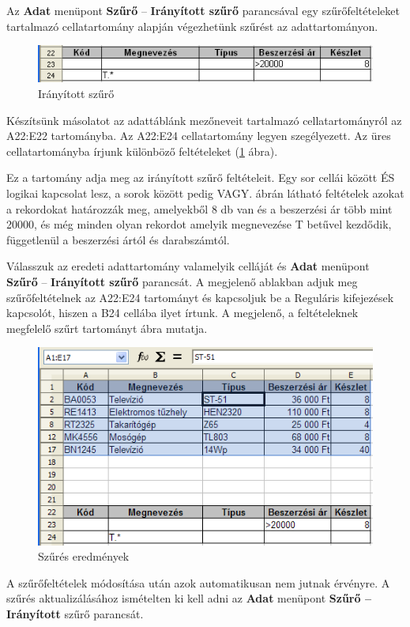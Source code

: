 Az \textbf{Adat} menüpont \textbf{Szűrő} --
\textbf{Irányított szűrő} parancsával egy
szűrőfeltételeket tartalmazó cellatartomány alapján
végezhetünk szűrést az adattartományon.

\begin{figure}[!h]
\begin{center}
\includegraphics[width=12.282cm]{oocalcv1-img118.png}
\caption{Irányított szűrő}\label{IrányítottSzűrő}
\end{center}
\end{figure}

Készítsünk másolatot az adattáblánk mezőneveit
tartalmazó cellatartományról az A22:E22 tartományba. Az A22:E24
cellatartomány legyen szegélyezett. Az üres cellatartományba
írjunk különböző feltételeket (\ref{IrányítottSzűrő} ábra).

Ez a tartomány adja meg az irányított szűrő feltételeit.
Egy sor cellái között ÉS logikai kapcsolat lesz, a sorok
között pedig VAGY.  ábrán látható feltételek azokat
a rekordokat határozzák meg, amelyekből 8 db van és a
beszerzési ár több mint 20000, és még minden olyan rekordot
amelyik megnevezése T betűvel kezdődik, függetlenül a
beszerzési ártól és darabszámtól.

Válasszuk az eredeti adattartomány valamelyik celláját és
\textbf{Adat} menüpont \textbf{Szűrő} --
\textbf{Irányított szűrő} parancsát. A megjelenő
ablakban adjuk meg szűrőfeltételnek az A22:E24 tartományt
és kapcsoljuk be a Reguláris kifejezések kapcsolót, hiszen a
B24 cellába ilyet írtunk. A megjelenő, a feltételeknek
megfelelő szűrt tartományt  ábra mutatja.

\begin{figure}[!h]
\begin{center}
\includegraphics[width=12.778cm]{oocalcv1-img119.png}
\caption{Szűrés eredmények}\label{SzűrésEredmények}
\end{center}
\end{figure}

A szűrőfeltételek módosítása után azok automatikusan
nem jutnak érvényre. A szűrés aktualizálásához
ismételten ki kell adni az \textbf{Adat} menüpont
\textbf{Szűrő -- Irányított} szűrő parancsát.

